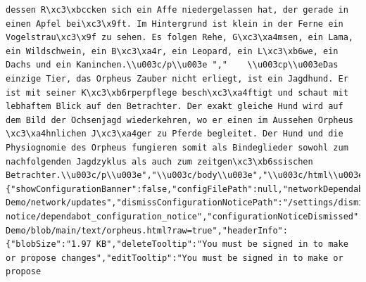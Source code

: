 \documentclass[
  letterpaper,
]{book}
\begin{document}
\begin{verbatim}
dessen R\xc3\xbccken sich ein Affe niedergelassen hat, der gerade in einen Apfel bei\xc3\x9ft. Im Hintergrund ist klein in der Ferne ein Vogelstrau\xc3\x9f zu sehen. Es folgen Rehe, G\xc3\xa4msen, ein Lama, ein Wildschwein, ein B\xc3\xa4r, ein Leopard, ein L\xc3\xb6we, ein Dachs und ein Kaninchen.\\u003c/p\\u003e ","    \\u003cp\\u003eDas einzige Tier, das Orpheus Zauber nicht erliegt, ist ein Jagdhund. Er ist mit seiner K\xc3\xb6rperpflege besch\xc3\xa4ftigt und schaut mit lebhaftem Blick auf den Betrachter. Der exakt gleiche Hund wird auf dem Bild der Ochsenjagd wiederkehren, wo er einen im Aussehen Orpheus \xc3\xa4hnlichen J\xc3\xa4ger zu Pferde begleitet. Der Hund und die Physiognomie des Orpheus fungieren somit als Bindeglieder sowohl zum nachfolgenden Jagdzyklus als auch zum zeitgen\xc3\xb6ssischen Betrachter.\\u003c/p\\u003e","\\u003c/body\\u003e","\\u003c/html\\u003e"],"stylingDirectives":null,"colorizedLines":null,"csv":null,"csvError":null,"dependabotInfo":{"showConfigurationBanner":false,"configFilePath":null,"networkDependabotPath":"/shionkim/CPS-Demo/network/updates","dismissConfigurationNoticePath":"/settings/dismiss-notice/dependabot_configuration_notice","configurationNoticeDismissed":null},"displayName":"orpheus.html","displayUrl":"https://github.com/shionkim/CPS-Demo/blob/main/text/orpheus.html?raw=true","headerInfo":{"blobSize":"1.97 KB","deleteTooltip":"You must be signed in to make or propose changes","editTooltip":"You must be signed in to make or propose 
\end{verbatim}
\end{document}
